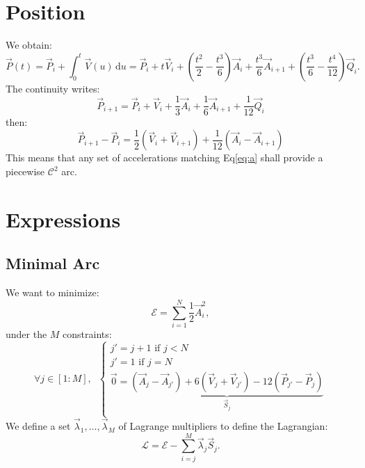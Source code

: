\documentclass[aps,12pt]{revtex4}
\begin{document}
\section{Position}
We obtain:
\begin{equation}
	\vec{P}(t) = \vec{P}_{i} + \int_0^t \vec{V}(u)  \,\mathrm{d}u = 
	\vec{P}_i + t \vec{V}_i + \left(\frac{t^2}{2}-\frac{t^3}{6}\right) \vec{A}_{i} 
	+ \frac{t^3}{6} \vec{A}_{i+1}
	+ \left(\frac{t^3}{6} - \frac{t^4}{12}\right) \vec{Q}_i.
\end{equation}
The continuity writes:
\begin{equation}
	\vec{P}_{i+1} = \vec{P}_{i} + \vec{V}_i + \frac{1}{3} \vec{A}_i + \frac{1}{6} \vec{A}_{i+1} + \frac{1}{12} \vec{Q}_i
\end{equation}
then:
\begin{equation}
\label{eq:a}
\boxed{
	\vec{P}_{i+1} - \vec{P}_{i} = \frac{1}{2} \left( \vec{V}_i + \vec{V}_{i+1} \right)
	+\frac{1}{12}\left(\vec{A}_{i}-\vec{A}_{i+1}\right)
	}
\end{equation}
This means that  any set of accelerations matching Eq\eqref{eq:a} shall provide a piecewise $\mathcal{C}^2$ arc.
\section{Expressions}
\subsection{Minimal Arc}
We want to minimize:
\begin{equation}
	\mathcal{E}  = \sum_{i=1}^{N} \frac{1}{2} \vec{A}_i^2,
\end{equation}
under the $M$ constraints:
\begin{equation}
\forall j \in [1:M],\;\;
\left\lbrace
\begin{array}{l}
	  j'=j+1  \mbox{ if } j<N\\
	  j' = 1  \mbox{ if } j=N\\
	 \vec{0}  = \underbrace{\left(\vec{A}_{j}-\vec{A}_{j'}\right) + 6 \left( \vec{V}_j + \vec{V}_{j'} \right ) - 12\left( \vec{P}_{j'} - \vec{P}_{j} \right)}_{\vec{S}_j}\\
\end{array}
\right.
\end{equation}
We define a set $\vec{\lambda}_1,\ldots,\vec{\lambda}_M$ of Lagrange multipliers to define the Lagrangian:
\begin{equation}
	\mathcal{L} = \mathcal{E} - \sum_{i=j}^M \vec{\lambda}_j \vec{S}_j.
\end{equation}
\end{document}
